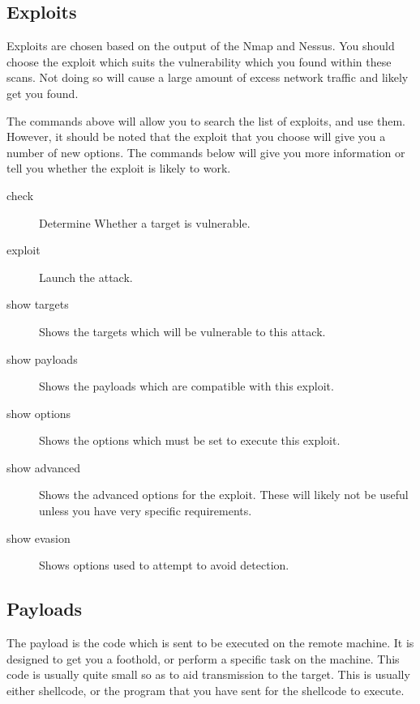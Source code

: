 \documentclass[a4paper,11pt]{report}
\begin{document}
			\subsection{Exploits}
				Exploits are chosen based on the output of the Nmap and Nessus. 
				You should choose the exploit which suits the vulnerability which you found within these scans. 
				Not doing so will cause a large amount of excess network traffic and likely get you found. 

				The commands above will allow you to search the list of exploits, and use them. 
				However, it should be noted that the exploit that you choose will give you a number of new options. 
				The commands below will give you more information or tell you whether the exploit is likely to work. 
				\begin{description}
					\item[check]
						Determine Whether a target is vulnerable. 
					\item[exploit] Launch the attack. 
					\item[show targets] Shows the targets which will be vulnerable to this attack.
					\item[show payloads] Shows the payloads which are compatible with this exploit. 
					\item[show options] Shows the options which must be set to execute this exploit. 
					\item[show advanced] Shows the advanced options for the exploit. 
						These will likely not be useful unless you have very specific requirements. 
					\item[show evasion] Shows options used to attempt to avoid detection.
				\end{description}
			\subsection{Payloads}
				The payload is the code which is sent to be executed on the remote machine. 
				It is designed to get you a foothold, or perform a specific task on the machine.
				This code is usually quite small so as to aid transmission to the target. 
				This is usually either shellcode, or the program that you have sent for the shellcode to execute. 
\end{document}
